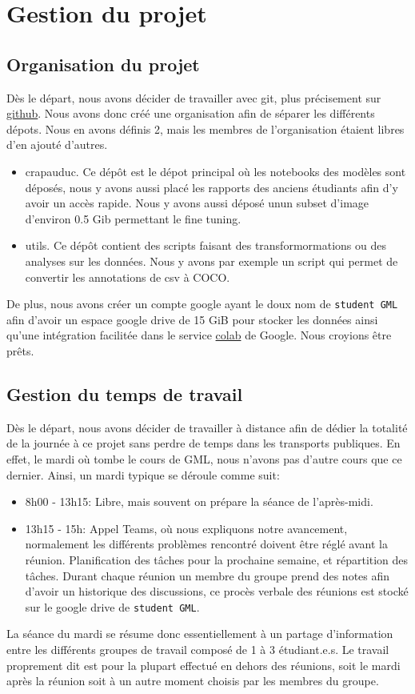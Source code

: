\chapter{Gestion du projet}
\section{Organisation du projet}
Dès le départ, nous avons décider de travailler avec git, plus précisement 
sur \href{https://github.com}{github}. Nous avons donc créé une organisation afin de séparer les différents dépots. Nous en avons définis 2, mais les membres de l'organisation étaient libres d'en ajouté d'autres.
\begin{itemize}
    \item crapauduc.  Ce dépôt est le dépot principal où les notebooks des modèles sont déposés, nous y avons aussi placé les rapports des anciens étudiants afin d'y avoir un accès rapide. Nous y avons aussi déposé unun subset d'image d'environ 0.5 Gib permettant le fine tuning.
    \item utils. Ce dépôt contient des scripts faisant des transformormations ou des analyses sur les données. Nous y avons par exemple un script qui permet de convertir les annotations de csv à COCO.
\end{itemize}

De plus, nous avons créer un compte google ayant le doux nom de \verb|student GML| afin d'avoir un espace google drive de 15 GiB pour stocker les données ainsi qu'une intégration facilitée dans le service \href{https://colab.research.google.com/}{colab} de Google. Nous croyions être prêts.


\section{Gestion du temps de travail}
Dès le départ, nous avons décider de travailler à distance afin de dédier 
la totalité de la journée à ce projet sans perdre de temps dans les transports publiques. En effet, le mardi où tombe le cours de GML, nous n'avons pas d'autre cours que ce dernier. Ainsi, un mardi typique se déroule comme suit:
\begin{itemize}
    \item 8h00 - 13h15: Libre, mais souvent on prépare la séance de l'après-midi.
    \item 13h15 - 15h: Appel Teams, où nous expliquons notre avancement, normalement les différents problèmes rencontré doivent être réglé avant la réunion. Planification des tâches pour la prochaine semaine, et répartition des tâches. Durant chaque réunion un membre du groupe prend des notes afin d'avoir un historique des discussions, ce procès verbale des réunions est stocké sur le google drive de \verb|student GML|.
    \label{item:seance}
\end{itemize}
La séance du mardi se résume donc essentiellement à un partage d'information entre les différents groupes de travail composé de 1 à 3 étudiant.e.s. Le travail proprement dit est pour la plupart effectué en dehors des réunions, soit le mardi après la réunion soit à un autre moment choisis par les membres du groupe.

